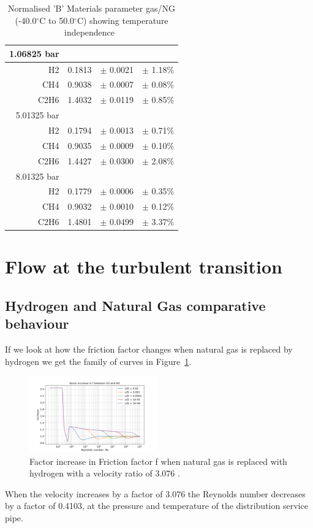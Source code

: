 \documentclass[5p]{elsarticle} %
\begin{document}
\begin{table}[htb]
\caption{\label{tab:bparameter}Normalised 'B' Materials parameter gas/NG (-40.0$^\circ$C to 50.0$^\circ$C) showing temperature independence~\citep{Sargents_github}}
\begin{tabular}{r|r|l |l}
\hline
     1.06825 bar \\
\hline
H2       &0.1813 &$\pm$    0.0021&$\pm$   1.18\%\\
CH4      &0.9038 &$\pm$   0.0007&$\pm$  0.08\%\\
C2H6     &1.4032 &$\pm$    0.0119&$\pm$    0.85\%\\
\hline
     5.01325 bar \\
\hline
H2       &0.1794 &$\pm$ 0.0013  &$\pm$ 0.71\%\\
CH4      &0.9035 &$\pm$ 0.0009  &$\pm$ 0.10\%\\
C2H6     &1.4427 &$\pm$ 0.0300 &$\pm$  2.08\%\\
\hline
     8.01325 bar \\
\hline
H2       &0.1779 &$\pm$ 0.0006 &$\pm$  0.35\%\\
CH4      &0.9032 &$\pm$ 0.0010 &$\pm$  0.12\%\\
C2H6     &1.4801 &$\pm$ 0.0499  &$\pm$ 3.37\%\\
\end{tabular}\end{table}

\section{Flow at the turbulent transition}
\subsection{Hydrogen and Natural Gas comparative behaviour}
\label{h2ng}
If we look at how the friction factor changes when natural gas is replaced by hydrogen we get the family of curves in Figure~\ref{fig:h2ng}.

\begin{figure}[htb]
\centering
\includegraphics[width=0.49\textwidth]{h2_ratio.png}
\caption{Factor increase in Friction factor f  when natural gas is replaced with hydrogen with a velocity ratio of 3.076 .}
\label{fig:h2ng}
\end{figure}
When the velocity increases by a factor of 3.076 the Reynolds number decreases by a factor of 0.4103, at the pressure and temperature of the distribution service pipe.
\end{document}
